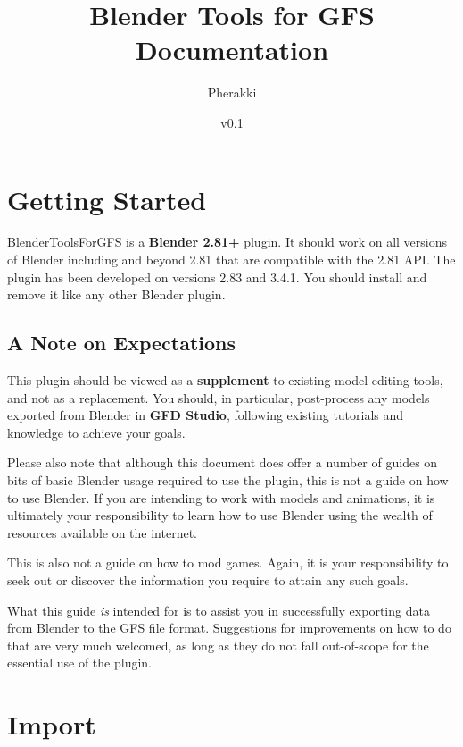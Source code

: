 \documentclass{article}
\title{Blender Tools for GFS Documentation}
\author{Pherakki}
\date{v0.1}
\begin{document}
\maketitle
{}
\clearpage

\tableofcontents
\clearpage


\section{Getting Started}
BlenderToolsForGFS is a \textbf{Blender 2.81+} plugin. It should work on all versions of Blender including and beyond 2.81 that are compatible with the 2.81 API. The plugin has been developed on versions 2.83 and 3.4.1. You should install and remove it like any other Blender plugin.

\subsection{A Note on Expectations}
This plugin should be viewed as a \textbf{supplement} to existing model-editing tools, and not as a replacement. You should, in particular, post-process any models exported from Blender in \textbf{GFD Studio}, following existing tutorials and knowledge to achieve your goals.

Please also note that although this document does offer a number of guides on bits of basic Blender usage required to use the plugin, this is not a guide on how to use Blender. If you are intending to work with models and animations, it is ultimately your responsibility to learn how to use Blender using the wealth of resources available on the internet.

This is also not a guide on how to mod games. Again, it is your responsibility to seek out or discover the information you require to attain any such goals.

What this guide \textit{is} intended for is to assist you in successfully exporting data from Blender to the GFS file format. Suggestions for improvements on how to do that are very much welcomed, as long as they do not fall out-of-scope for the essential use of the plugin.
\clearpage

\section{Import}
\end{document}
